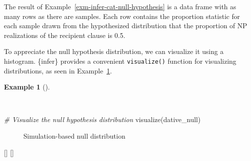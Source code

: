 \documentclass[
  letterpaper,
  krantz1]{latex/krantz-mod}
\newenvironment{Shaded}{\begin{snugshade}}{\end{snugshade}}
\newcommand{\CommentTok}[1]{\textcolor[rgb]{0.00,0.00,0.00}{\textit{#1}}}
\newcommand{\FunctionTok}[1]{\textcolor[rgb]{0.00,0.00,0.00}{#1}}
\newcommand{\NormalTok}[1]{\textcolor[rgb]{0.00,0.00,0.00}{#1}}
\newcommand{\cindex}[1]{%
  \StrSubstitute{#1}{_}{\_}[\temp]%
  \index{\temp}%
}
\theoremstyle{definition}
\theoremstyle{definition}
\newtheorem{example}{Example}[chapter]
\theoremstyle{remark}
\begin{document}
The result of Example~\ref{exm-infer-cat-null-hypothesis} is a data
frame with as many rows as there are samples. Each
row contains the proportion statistic for each sample drawn from the
hypothesized distribution that the proportion of NP realizations of the
recipient clause is 0.5.

To appreciate the null hypothesis
distribution, we can visualize it
using a histogram. \{infer\} provides a convenient
\texttt{visualize()} function for visualizing distributions, as seen in
Example~\ref{exm-infer-cat-null-hypothesis-vis}.

\begin{example}[]\protect\hypertarget{exm-infer-cat-null-hypothesis-vis}{}\label{exm-infer-cat-null-hypothesis-vis}

~

\begin{Shaded}
\begin{Highlighting}[numbers=left,,]
\CommentTok{\# Visualize the null hypothesis distribution}
\FunctionTok{visualize}\NormalTok{(dative\_null)}
\end{Highlighting}
\end{Shaded}

\begin{figure}[!htb]


\caption{\label{fig-infer-cat-null-hypothesis}Simulation-based null
distribution}

\end{figure}%

 \cindex{visualize()}\cindex{labs()}

\end{example}
\end{document}
